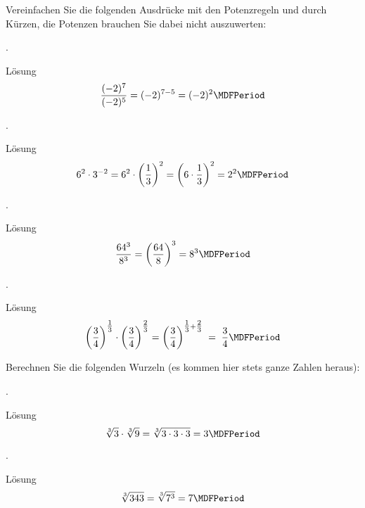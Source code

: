 \begin{MExercises}
\begin{MExercise}
Vereinfachen Sie die folgenden Ausdrücke mit den Potenzregeln und durch Kürzen, die Potenzen brauchen Sie dabei nicht auszuwerten:
\begin{MExerciseItems}
\item{.\\\begin{MHint}{Lösung} $$\Mdfrac{(-2)^7}{(-2)^5}=(-2)^{7-5}=(-2)^2 \MDFPeriod$$\end{MHint}}
\item{.\\\begin{MHint}{Lösung} $$6^2\cdot 3^{-2}=6^2\cdot \left({\Mdfrac13}\right)^{2}=\left({6\cdot\Mdfrac13}\right)^2=2^2 \MDFPeriod$$\end{MHint}}
\item{.\\\begin{MHint}{Lösung} $$\Mdfrac{64^3}{8^3}=\left({\Mdfrac{64}{8}}\right)^3=8^3 \MDFPeriod$$\end{MHint}}
\item{.\\
\begin{MHint}{Lösung}
$$
\left(\Mdfrac34\right)^{\Mtfrac13}\cdot\left(\Mdfrac34\right)^{\Mtfrac23} = \left(\Mdfrac34\right)^{\Mtfrac13+\Mtfrac23} \;=\; \Mdfrac34  \MDFPeriod
$$
\end{MHint}}
\end{MExerciseItems}
\end{MExercise}

\begin{MExercise}
Berechnen Sie die folgenden Wurzeln (es kommen hier stets ganze Zahlen heraus):
\begin{MExerciseItems}
\item{.\\\begin{MHint}{Lösung} $$\sqrt[3]{3}\cdot \sqrt[3]{9}=\sqrt[3]{3\cdot 3\cdot 3}=3 \MDFPeriod$$\end{MHint}}
\item{.\\\begin{MHint}{Lösung} $$\sqrt[3]{343}=\sqrt[3]{7^3}=7 \MDFPeriod$$\end{MHint}}
\end{MExerciseItems}
\end{MExercise}


\end{MExercises}
